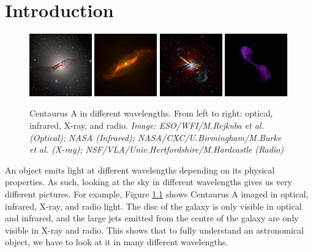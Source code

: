 
\chapter{Introduction}
\label{cha:intro}

\begin{figure}
  \centering
  \includegraphics[width=0.24\textwidth]{images/centaurus_a_optical}
  \includegraphics[width=0.24\textwidth]{images/centaurus_a_infrared}
  \includegraphics[width=0.24\textwidth]{images/centaurus_a_xray}
  \includegraphics[width=0.24\textwidth]{images/centaurus_a_radio}
  \caption{Centaurus A in different wavelengths. From left to right: optical,
    infrared, X-ray, and radio. \emph{Image: ESO/WFI/M.Rejkuba et al. (Optical);
    NASA (Infrared); NASA/CXC/U.Birmingham/M.Burke et al. (X-ray);
    NSF/VLA/Univ.Hertfordshire/M.Hardcastle (Radio)}}
  \label{fig:different-wavelengths}
\end{figure}


An object emits light at different wavelengths depending on its physical
properties. As such, looking at the sky in different wavelengths gives us very
different pictures. For example, Figure \ref{fig:different-wavelengths} shows
Centaurus A imaged in optical, infrared, X-ray, and radio light. The disc of
the galaxy is only visible in optical and infrared, and the large jets emitted
from the centre of the galaxy are only visible in X-ray and radio. This shows
that to fully understand an astronomical object, we have to look at it in many
different wavelengths.

